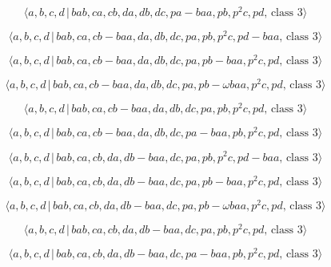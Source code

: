 \documentclass[10pt]{article}
\begin{document}
\begin{equation}
\langle a,b,c,d\,|\,bab,ca,cb,da,db,dc,pa-baa,pb,p^2c,pd,\,\text{class }%
3\rangle  \tag{7.3677}
\end{equation}

\begin{equation}
\langle a,b,c,d\,|\,bab,ca,cb-baa,da,db,dc,pa,pb,p^2c,pd-baa,\,\text{class }%
3\rangle  \tag{7.3678}
\end{equation}

\begin{equation}
\langle a,b,c,d\,|\,bab,ca,cb-baa,da,db,dc,pa,pb-baa,p^2c,pd,\,\text{class }%
3\rangle  \tag{7.3679}
\end{equation}

\begin{equation}
\langle a,b,c,d\,|\,bab,ca,cb-baa,da,db,dc,pa,pb-\omega baa,p^{2}c,pd,\,%
\text{class }3\rangle  \tag{7.3680}
\end{equation}

\begin{equation}
\langle a,b,c,d\,|\,bab,ca,cb-baa,da,db,dc,pa,pb,p^2c,pd,\,\text{class }%
3\rangle  \tag{7.3681}
\end{equation}

\begin{equation}
\langle a,b,c,d\,|\,bab,ca,cb-baa,da,db,dc,pa-baa,pb,p^2c,pd,\,\text{class }%
3\rangle  \tag{7.3682}
\end{equation}

\begin{equation}
\langle a,b,c,d\,|\,bab,ca,cb,da,db-baa,dc,pa,pb,p^2c,pd-baa,\,\text{class }%
3\rangle  \tag{7.3683}
\end{equation}

\begin{equation}
\langle a,b,c,d\,|\,bab,ca,cb,da,db-baa,dc,pa,pb-baa,p^2c,pd,\,\text{class }%
3\rangle  \tag{7.3684}
\end{equation}

\begin{equation}
\langle a,b,c,d\,|\,bab,ca,cb,da,db-baa,dc,pa,pb-\omega baa,p^{2}c,pd,\,%
\text{class }3\rangle  \tag{7.3685}
\end{equation}

\begin{equation}
\langle a,b,c,d\,|\,bab,ca,cb,da,db-baa,dc,pa,pb,p^2c,pd,\,\text{class }%
3\rangle  \tag{7.3686}
\end{equation}

\begin{equation}
\langle a,b,c,d\,|\,bab,ca,cb,da,db-baa,dc,pa-baa,pb,p^2c,pd,\,\text{class }%
3\rangle  \tag{7.3687}
\end{equation}
\end{document}
